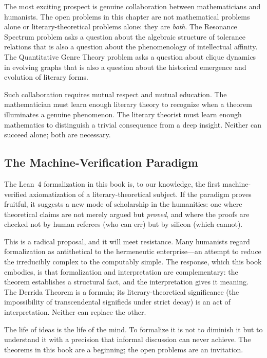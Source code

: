\documentclass[11pt,openany]{book}
\theoremstyle{definition}
\theoremstyle{plain}
\theoremstyle{remark}
\begin{document}
The most exciting prospect is genuine collaboration between mathematicians and humanists. The open problems in this chapter are not mathematical problems alone or literary-theoretical problems alone: they are \emph{both}. The Resonance Spectrum problem asks a question about the algebraic structure of tolerance relations that is also a question about the phenomenology of intellectual affinity. The Quantitative Genre Theory problem asks a question about clique dynamics in evolving graphs that is also a question about the historical emergence and evolution of literary forms.

Such collaboration requires mutual respect and mutual education. The mathematician must learn enough literary theory to recognize when a theorem illuminates a genuine phenomenon. The literary theorist must learn enough mathematics to distinguish a trivial consequence from a deep insight. Neither can succeed alone; both are necessary.

\subsection{The Machine-Verification Paradigm}

The Lean~4 formalization in this book is, to our knowledge, the first machine-verified axiomatization of a literary-theoretical subject. If the paradigm proves fruitful, it suggests a new mode of scholarship in the humanities: one where theoretical claims are not merely argued but \emph{proved}, and where the proofs are checked not by human referees (who can err) but by silicon (which cannot).

This is a radical proposal, and it will meet resistance. Many humanists regard formalization as antithetical to the hermeneutic enterprise---an attempt to reduce the irreducibly complex to the computably simple. The response, which this book embodies, is that formalization and interpretation are complementary: the theorem establishes a structural fact, and the interpretation gives it meaning. The Derrida Theorem is a formula; its literary-theoretical significance (the impossibility of transcendental signifieds under strict decay) is an act of interpretation. Neither can replace the other.

The life of ideas is the life of the mind. To formalize it is not to diminish it but to understand it with a precision that informal discussion can never achieve. The theorems in this book are a beginning; the open problems are an invitation.
\end{document}
